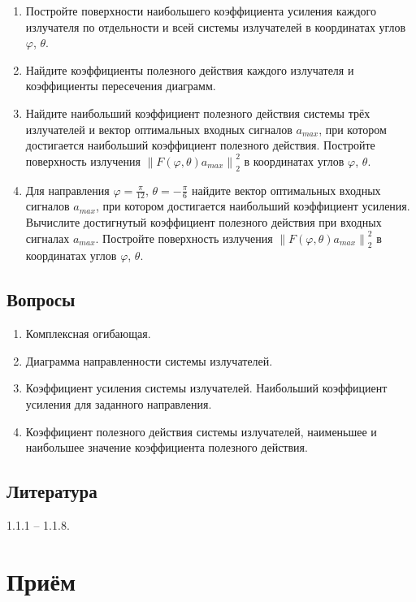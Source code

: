 \documentclass[a4paper,12pt]{article}
\newcommand{\snorm}[1]{\left\| #1 \right\|_2}
\begin{document}
\begin{enumerate}
    \item Постройте поверхности наибольшего коэффициента усиления каждого излучателя по отдельности и всей системы излучателей
          в координатах углов $\varphi$, $\theta$.
    \item Найдите коэффициенты полезного действия каждого излучателя и коэффициенты пересечения диаграмм.
    \item Найдите наибольший коэффициент полезного действия системы трёх излучателей и вектор оптимальных входных сигналов $a_{max}$,
          при котором достигается наибольший коэффициент полезного действия. Постройте поверхность излучения $\snorm{F(\varphi, \theta) a_{max}}^2$
          в координатах углов $\varphi$, $\theta$.
    \item Для направления $\varphi = \frac{\pi}{12}$, $\theta = -\frac{\pi}{6}$ найдите вектор оптимальных входных сигналов $a_{max}$,
          при котором достигается наибольший коэффициент усиления. Вычислите достигнутый коэффициент полезного действия при входных сигналах $a_{max}$.
          Постройте поверхность излучения $\snorm{F(\varphi, \theta) a_{max}}^2$ в координатах углов $\varphi$, $\theta$.
\end{enumerate}

\subsection{Вопросы}

\begin{enumerate}
    \item Комплексная огибающая.
    \item Диаграмма направленности системы излучателей.
    \item Коэффициент усиления системы излучателей. Наибольший коэффициент усиления для заданного направления.
    \item Коэффициент полезного действия системы излучателей, наименьшее и наибольшее значение коэффициента полезного действия.
\end{enumerate}

\subsection{Литература}

\cite{Indenbom} 1.1.1 -- 1.1.8.

\section{Приём}
\end{document}

